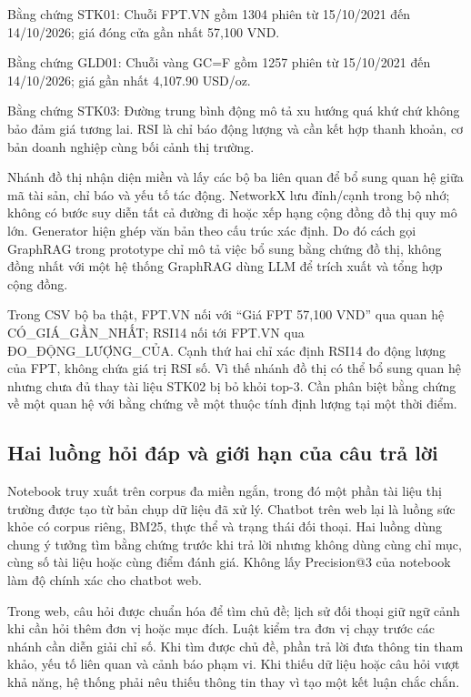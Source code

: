 Bằng chứng STK01: Chuỗi FPT.VN gồm 1304 phiên từ 15/10/2021 đến
14/10/2026; giá đóng cửa gần nhất 57,100 VND.

Bằng chứng GLD01: Chuỗi vàng GC=F gồm 1257 phiên từ 15/10/2021 đến
14/10/2026; giá gần nhất 4,107.90 USD/oz.

Bằng chứng STK03: Đường trung bình động mô tả xu hướng quá khứ chứ không
bảo đảm giá tương lai. RSI là chỉ báo động lượng và cần kết hợp thanh
khoản, cơ bản doanh nghiệp cùng bối cảnh thị trường.

Nhánh đồ thị nhận diện miền và lấy các bộ ba liên quan để bổ sung quan
hệ giữa mã tài sản, chỉ báo và yếu tố tác động. NetworkX lưu đỉnh/cạnh
trong bộ nhớ; không có bước suy diễn tất cả đường đi hoặc xếp hạng cộng
đồng đồ thị quy mô lớn. Generator hiện ghép văn bản theo cấu trúc xác
định. Do đó cách gọi GraphRAG trong prototype chỉ mô tả việc bổ sung
bằng chứng đồ thị, không đồng nhất với một hệ thống GraphRAG dùng LLM để
trích xuất và tổng hợp cộng đồng.

Trong CSV bộ ba thật, FPT.VN nối với ``Giá FPT 57,100 VND'' qua quan hệ
CÓ\_GIÁ\_GẦN\_NHẤT; RSI14 nối tới FPT.VN qua ĐO\_ĐỘNG\_LƯỢNG\_CỦA. Cạnh
thứ hai chỉ xác định RSI14 đo động lượng của FPT, không chứa giá trị RSI
số. Vì thế nhánh đồ thị có thể bổ sung quan hệ nhưng chưa đủ thay tài
liệu STK02 bị bỏ khỏi top-3. Cần phân biệt bằng chứng về một quan hệ với
bằng chứng về một thuộc tính định lượng tại một thời điểm.

\subsection{Hai luồng hỏi đáp và giới hạn của câu trả lời}\label{hai-luux1ed3ng-hux1ecfi-ux111uxe1p-vuxe0-giux1edbi-hux1ea1n-cux1ee7a-cuxe2u-trux1ea3-lux1eddi}

Notebook truy xuất trên corpus đa miền ngắn, trong đó một phần tài liệu
thị trường được tạo từ bản chụp dữ liệu đã xử lý. Chatbot trên web lại là luồng
sức khỏe có corpus riêng, BM25, thực thể và trạng thái đối thoại. Hai
luồng dùng chung ý tưởng tìm bằng chứng trước khi trả lời nhưng không
dùng cùng chỉ mục, cùng số tài liệu hoặc cùng điểm đánh giá. Không lấy
Precision@3 của notebook làm độ chính xác cho chatbot web.

Trong web, câu hỏi được chuẩn hóa để tìm chủ đề; lịch sử đối thoại giữ
ngữ cảnh khi cần hỏi thêm đơn vị hoặc mục đích. Luật kiểm tra đơn vị
chạy trước các nhánh cần diễn giải chỉ số. Khi tìm được chủ đề, phần trả
lời đưa thông tin tham khảo, yếu tố liên quan và cảnh báo phạm vi. Khi
thiếu dữ liệu hoặc câu hỏi vượt khả năng, hệ thống phải nêu thiếu thông
tin thay vì tạo một kết luận chắc chắn.

